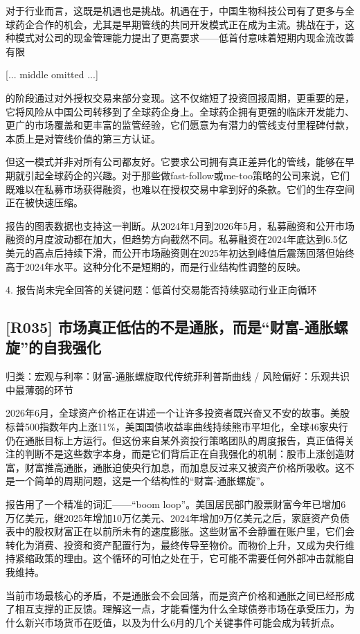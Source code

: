 \documentclass[11pt]{ctexart}
\begin{document}
对于行业而言，这既是机遇也是挑战。机遇在于，中国生物科技公司有了更多与全球药企合作的机会，尤其是早期管线的共同开发模式正在成为主流。挑战在于，这种模式对公司的现金管理能力提出了更高要求——低首付意味着短期内现金流改善有限

[... middle omitted ...]

的阶段通过对外授权交易来部分变现。这不仅缩短了投资回报周期，更重要的是，它将风险从中国公司转移到了全球药企身上。全球药企拥有更强的临床开发能力、更广的市场覆盖和更丰富的监管经验，它们愿意为有潜力的管线支付里程碑付款，本质上是对管线价值的第三方认证。

但这一模式并非对所有公司都友好。它要求公司拥有真正差异化的管线，能够在早期就引起全球药企的兴趣。对于那些做fast-follow或me-too策略的公司来说，它们既难以在私募市场获得融资，也难以在授权交易中拿到好的条款。它们的生存空间正在被快速压缩。

报告的图表数据也支持这一判断。从2024年1月到2026年5月，私募融资和公开市场融资的月度波动都在加大，但趋势方向截然不同。私募融资在2024年底达到6.5亿美元的高点后持续下滑，而公开市场融资则在2025年初达到峰值后震荡回落但始终高于2024年水平。这种分化不是短期的，而是行业结构性调整的反映。

4. 报告尚未完全回答的关键问题：低首付交易能否持续驱动行业正向循环

\subsection{[R035] 市场真正低估的不是通胀，而是“财富-通胀螺旋”的自我强化}
{\small\color{refgray}归类：宏观与利率：财富-通胀螺旋取代传统菲利普斯曲线 / 风险偏好：乐观共识中最薄弱的环节}

2026年6月，全球资产价格正在讲述一个让许多投资者既兴奋又不安的故事。美股标普500指数年内上涨11\%，美国国债收益率曲线持续熊市平坦化，全球46家央行仍在通胀目标上方运行。但这份来自某外资投行策略团队的周度报告，真正值得关注的判断不是这些数字本身，而是它们背后正在自我强化的机制：股市上涨创造财富，财富推高通胀，通胀迫使央行加息，而加息反过来又被资产价格所吸收。这不是一个简单的周期问题，这是一个结构性的“财富-通胀螺旋”。

报告用了一个精准的词汇——“boom loop”。美国居民部门股票财富今年已增加6万亿美元，继2025年增加10万亿美元、2024年增加9万亿美元之后，家庭资产负债表中的股权财富正在以前所未有的速度膨胀。这些财富不会静置在账户里，它们会转化为消费、投资和资产配置行为，最终传导至物价。而物价上升，又成为央行维持紧缩政策的理由。这个循环的可怕之处在于，它可能不需要任何外部冲击就能自我维持。

当前市场最核心的矛盾，不是通胀会不会回落，而是资产价格和通胀之间已经形成了相互支撑的正反馈。理解这一点，才能看懂为什么全球债券市场在承受压力，为什么新兴市场货币在贬值，以及为什么6月的几个关键事件可能会成为转折点。
\end{document}
